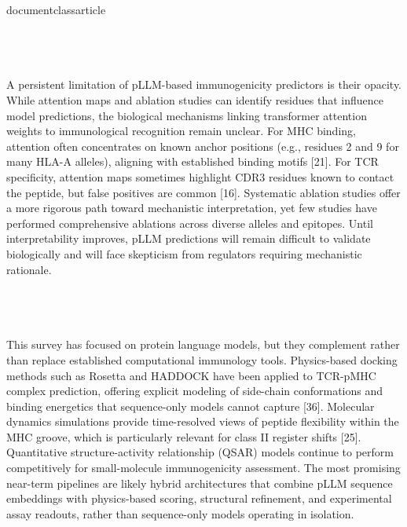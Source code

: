 \\documentclass{article}
\begin{document}
\subsection{}

A persistent limitation of pLLM-based immunogenicity predictors is their opacity. While attention maps and ablation studies can identify residues that influence model predictions, the biological mechanisms linking transformer attention weights to immunological recognition remain unclear. For MHC binding, attention often concentrates on known anchor positions (e.g., residues 2 and 9 for many HLA-A alleles), aligning with established binding motifs [21]. For TCR specificity, attention maps sometimes highlight CDR3 residues known to contact the peptide, but false positives are common [16]. Systematic ablation studies offer a more rigorous path toward mechanistic interpretation, yet few studies have performed comprehensive ablations across diverse alleles and epitopes. Until interpretability improves, pLLM predictions will remain difficult to validate biologically and will face skepticism from regulators requiring mechanistic rationale.

\subsection{}

This survey has focused on protein language models, but they complement rather than replace established computational immunology tools. Physics-based docking methods such as Rosetta and HADDOCK have been applied to TCR-pMHC complex prediction, offering explicit modeling of side-chain conformations and binding energetics that sequence-only models cannot capture [36]. Molecular dynamics simulations provide time-resolved views of peptide flexibility within the MHC groove, which is particularly relevant for class II register shifts [25]. Quantitative structure-activity relationship (QSAR) models continue to perform competitively for small-molecule immunogenicity assessment. The most promising near-term pipelines are likely hybrid architectures that combine pLLM sequence embeddings with physics-based scoring, structural refinement, and experimental assay readouts, rather than sequence-only models operating in isolation.

\subsection{}
\end{document}
